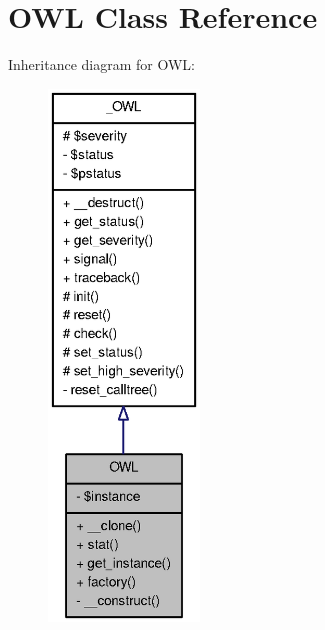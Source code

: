 \section{OWL Class Reference}
\label{classOWL}


Inheritance diagram for OWL:\nopagebreak
\begin{figure}[H]
\begin{center}
\leavevmode
\includegraphics[height=400pt]{classOWL__inherit__graph}
\end{center}
\end{figure}


